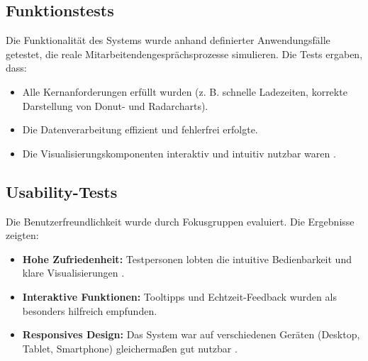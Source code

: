 \subsection{Funktionstests}
Die Funktionalit\"at des Systems wurde anhand definierter Anwendungsf\"alle getestet, die reale Mitarbeitendengespr\"achs\-prozesse simulieren. Die Tests ergaben, dass:
\begin{itemize}
    \item Alle Kernanforderungen erf\"ullt wurden (z. B. schnelle Ladezeiten, korrekte Darstellung von Donut- und Radarcharts).
    \item Die Datenverarbeitung effizient und fehlerfrei erfolgte.
    \item Die Visualisierungskomponenten interaktiv und intuitiv nutzbar waren \cite{watson2014bigdata}.
\end{itemize}

\subsection{Usability-Tests}
Die Benutzerfreundlichkeit wurde durch Fokusgruppen evaluiert. Die Ergebnisse zeigten:
\begin{itemize}
    \item \textbf{Hohe Zufriedenheit:} Testpersonen lobten die intuitive Bedienbarkeit und klare Visualisierungen \cite{khairat2018impact}.
    \item \textbf{Interaktive Funktionen:} Tooltipps und Echtzeit-Feedback wurden als besonders hilfreich empfunden.
    \item \textbf{Responsives Design:} Das System war auf verschiedenen Ger\"aten (Desktop, Tablet, Smartphone) gleicherma\ss en gut nutzbar \cite{tarvainen2014kubios}.
\end{itemize}

